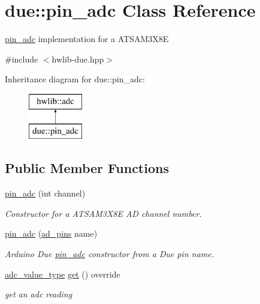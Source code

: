 \hypertarget{classdue_1_1pin__adc}{}\section{due\+:\+:pin\+\_\+adc Class Reference}
\label{classdue_1_1pin__adc}


\hyperlink{classdue_1_1pin__adc}{pin\+\_\+adc} implementation for a A\+T\+S\+A\+M3\+X8E  




{\ttfamily \#include $<$hwlib-\/due.\+hpp$>$}

Inheritance diagram for due\+:\+:pin\+\_\+adc\+:\begin{figure}[H]
\begin{center}
\leavevmode
\includegraphics[height=2.000000cm]{classdue_1_1pin__adc}
\end{center}
\end{figure}
\subsection*{Public Member Functions}
\begin{DoxyCompactItemize}
\item 
\hyperlink{classdue_1_1pin__adc_a3b84a29f1ff159f40361ed969a1c8dd2}{pin\+\_\+adc} (int channel)
\begin{DoxyCompactList}\small\item\em Constructor for a A\+T\+S\+A\+M3\+X8E AD channel number. \end{DoxyCompactList}\item 
\hyperlink{classdue_1_1pin__adc_a106bc97a20bb90be8cc0d8d9152d201f}{pin\+\_\+adc} (\hyperlink{namespacedue_a5ecc98d40585c91eabbfb14f71bd7d4c}{ad\+\_\+pins} name)
\begin{DoxyCompactList}\small\item\em Arduino Due \hyperlink{classdue_1_1pin__adc}{pin\+\_\+adc} constructor from a Due pin name. \end{DoxyCompactList}\item 
\hyperlink{classhwlib_1_1adc_a7ce65f485597a481a518a4b84073605f}{adc\+\_\+value\+\_\+type} \hyperlink{classdue_1_1pin__adc_a024c090f8d9f0de7a3414d1d3dfe33d9}{get} () override
\begin{DoxyCompactList}\small\item\em get an adc reading \end{DoxyCompactList}\end{DoxyCompactItemize}
